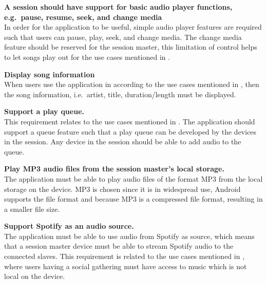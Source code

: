 \begin{eletterate}[resume]
    \item\label{req:basic} \textbf{A session should have support for basic audio player functions, e.g.~pause, resume, seek, and change media} \hfill\\
        In order for the application to be useful, simple audio player features are required such that users can pause, play, seek, and change media.
        The change media feature should be reserved for the session master, this limitation of control helps to let songs play out for the use cases mentioned in .

    \item\label{req:info} \textbf{Display song information} \hfill\\
        When users use the application in according to the use cases mentioned in ,
        then the song information, i.e.~artist, title, duration/length must be displayed.

    \item\label{req:queue} \textbf{Support a play queue.} \hfill\\
        This requirement relates to the use cases mentioned in .
        The application should support a queue feature such that a play queue can be developed by the devices in the session.
        Any device in the session should be able to add audio to the queue.

    \item\label{req:mp3} \textbf{Play MP3 audio files from the session master's local storage.} \hfill\\
        The application must be able to play audio files of the format MP3 from the local storage on the device.
        MP3 is chosen since it is in widespread use, Android supports the file format and because MP3 is a compressed file format,
        resulting in a smaller file size\cite{android_mp3_support, mp3_compression}.

    \item\label{req:spotify} \textbf{Support Spotify as an audio source.} \hfill\\
        The application must be able to use audio from Spotify as source,
        which means that a session master device must be able to stream Spotify audio to the connected slaves.
        This requirement is related to the use cases mentioned in ,
        where users having a social gathering must have access to music which is not local on the device.
\end{eletterate}

